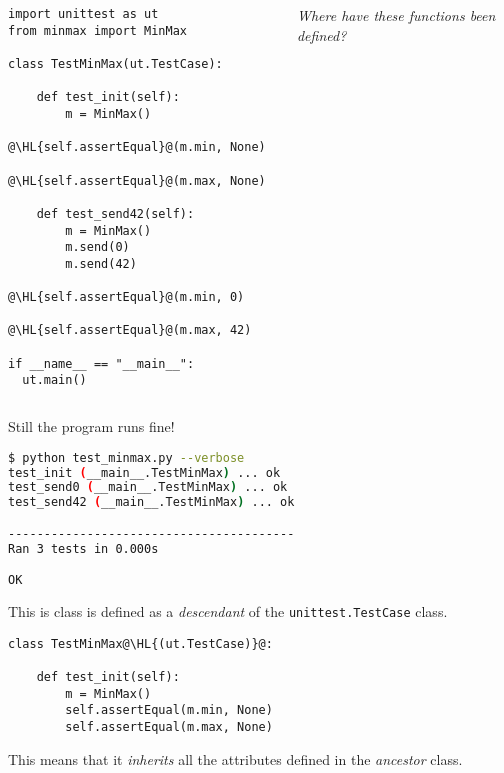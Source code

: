 \documentclass[english,serif,mathserif,xcolor=pdftex,dvipsnames,table]{beamer}
\begin{document}
\begin{frame}[fragile]
  \begin{columns}[t]
    \begin{column}{0.5\textwidth}
\begin{lstlisting}
import unittest as ut
from minmax import MinMax

class TestMinMax(ut.TestCase):

    def test_init(self):
        m = MinMax()
        @\HL{self.assertEqual}@(m.min, None)
        @\HL{self.assertEqual}@(m.max, None)

    def test_send42(self):
        m = MinMax()
        m.send(0)
        m.send(42)
        @\HL{self.assertEqual}@(m.min, 0)
        @\HL{self.assertEqual}@(m.max, 42)

if __name__ == "__main__":
  ut.main()
\end{lstlisting}
    \end{column}
    \begin{column}{0.5\textwidth}
      \raggedleft 
      \emph{Where have these functions been defined?}
    \end{column}
  \end{columns}
\end{frame}


\begin{frame}[fragile]
  Still the program runs fine!

  \+
\begin{lstlisting}[language=sh]
$ python test_minmax.py --verbose
test_init (__main__.TestMinMax) ... ok
test_send0 (__main__.TestMinMax) ... ok
test_send42 (__main__.TestMinMax) ... ok

----------------------------------------
Ran 3 tests in 0.000s

OK
\end{lstlisting}
\end{frame}

\begin{frame}[fragile]
  This is class is defined as a \emph{descendant} of
  the \texttt{unittest.TestCase} class.
  
  \+ 
\begin{lstlisting}
class TestMinMax@\HL{(ut.TestCase)}@:

    def test_init(self):
        m = MinMax()
        self.assertEqual(m.min, None)
        self.assertEqual(m.max, None)
\end{lstlisting}

  \+
  This means that it \emph{inherits} all the attributes defined
  in the \emph{ancestor} class.
\end{frame}
\end{document}

